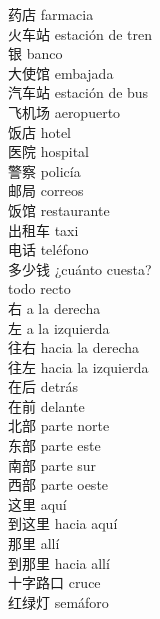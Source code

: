 药店 \quad farmacia\\
火车站 \quad estación de tren\\
银 \quad banco\\
大使馆 \quad embajada\\
汽车站 \quad estación de bus\\
飞机场 \quad aeropuerto\\
饭店 \quad hotel\\
医院 \quad hospital\\
警察 \quad policía\\
邮局 \quad correos\\
饭馆 \quad restaurante\\
出租车 \quad taxi\\
电话 \quad teléfono\\
多少钱 \quad ¿cuánto cuesta?\\
 \quad todo recto\\
右 \quad a la derecha\\
左 \quad a la izquierda\\
往右 \quad hacia la derecha\\
往左 \quad hacia la izquierda\\
在后 \quad detrás\\
在前 \quad delante\\
北部 \quad parte norte\\
东部 \quad parte este\\
南部 \quad parte sur\\
西部 \quad parte oeste\\
这里 \quad aquí\\
到这里 \quad hacia aquí\\
那里 \quad allí\\
到那里 \quad hacia allí\\
十字路口 \quad cruce\\
红绿灯 \quad semáforo\\
